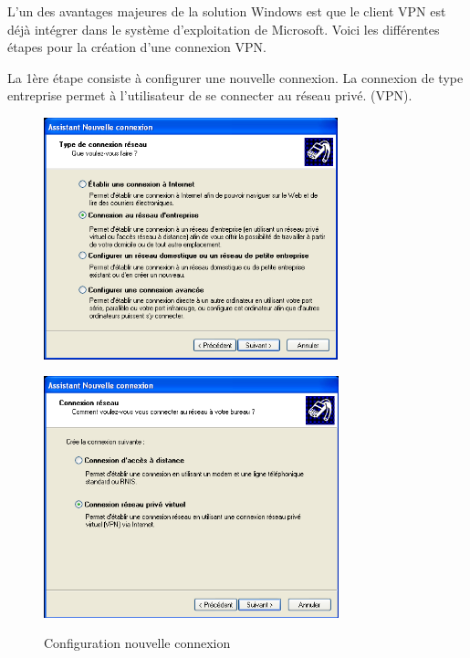 L'un des avantages majeures de la solution Windows est que le client VPN est déjà intégrer dans le système d'exploitation de Microsoft. Voici les différentes étapes pour la création d'une connexion VPN.

La 1ère étape consiste à configurer une nouvelle connexion. La connexion de type entreprise permet à l'utilisateur de se connecter au réseau privé. (VPN).

\begin{figure}[H]
	\begin{minipage}{0.5\textwidth}
		\begin{flushleft} \large
			\includegraphics[height=7cm]{partie_2/screen_windows/etape1.PNG}\\
		\end{flushleft}
	\end{minipage}
	\begin{minipage}{0.43\textwidth}
		\begin{flushright} \large
			\includegraphics[height=7cm]{partie_2/screen_windows/etape2.PNG}\\
		\end{flushright}
	\end{minipage}
	\caption{Configuration nouvelle connexion}
	\label{VPN_ETAPE1}
\end{figure}
~\

